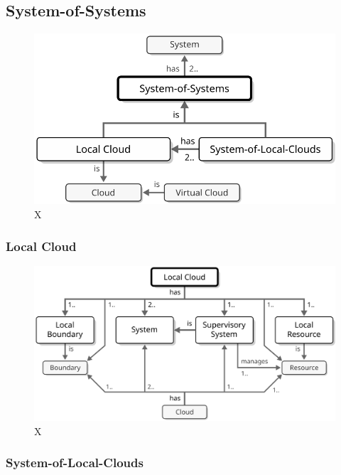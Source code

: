 \subsection{System-of-Systems}
\label{sec:reference-model:system-of-systems}

\begin{figure}[ht!]
  \centering
  \includegraphics[scale=0.9]{figures/system-of-systems}
  \caption{
    X
  }
  \label{fig:system-of-systems}
\end{figure}

\subsubsection{Local Cloud}
\label{sec:reference-model:system-of-systems:local-cloud}

\begin{figure}[ht!]
  \centering
  \includegraphics[scale=0.9]{figures/local-cloud}
  \caption{
    X
  }
  \label{fig:local-cloud}
\end{figure}

\subsubsection{System-of-Local-Clouds}
\label{sec:reference-model:system-of-systems:system-of-local-clouds}

